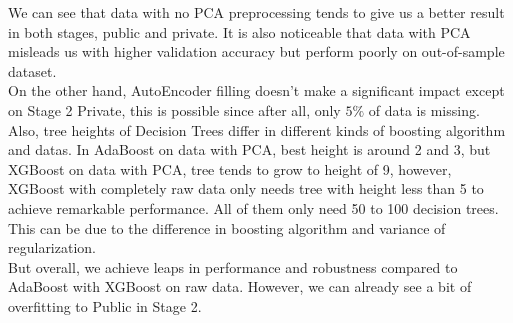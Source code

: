 \documentclass[11pt,a4paper]{article}
\begin{document}
We can see that data with no PCA preprocessing tends to give us a better result in both stages, public and private. It is also noticeable that data with PCA misleads us with higher validation accuracy but perform poorly on out-of-sample dataset. \\
On the other hand, AutoEncoder filling doesn't make a significant impact except on Stage 2 Private, this is possible since after all, only $5\%$ of data is missing.\\
Also, tree heights of Decision Trees differ in different kinds of boosting algorithm and datas. In AdaBoost on data with PCA, best height is around 2 and 3, but XGBoost on data with PCA, tree tends to grow to height of 9, however, XGBoost with completely raw data only needs tree with height less than 5 to achieve remarkable performance. All of them only need 50 to 100 decision trees. This can be due to the difference in boosting algorithm and variance of regularization.\\
But overall, we achieve leaps in performance and robustness compared to AdaBoost with XGBoost on raw data. However, we can already see a bit of overfitting to Public in Stage 2.


\end{document}
